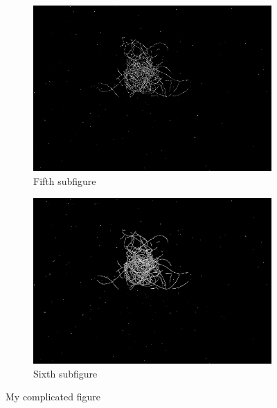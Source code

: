 \documentclass[german,a4paper, 12pt]{scrartcl}
\begin{document}
\begin{figure}[H]
	\medskip
	\begin{subfigure}{0.48\textwidth}
		\includegraphics[width=\linewidth]{figBina/04edges.png}
		\caption{Fifth subfigure} \label{fig:e}
	\end{subfigure}\hspace*{\fill}
	\begin{subfigure}{0.48\textwidth}
		\includegraphics[width=\linewidth]{figBina/05intenstiy.png}
		\caption{Sixth subfigure} \label{fig:f}
	\end{subfigure}
	
	
	\caption{My complicated figure} \label{fig:1}
\end{figure}
\end{document}
